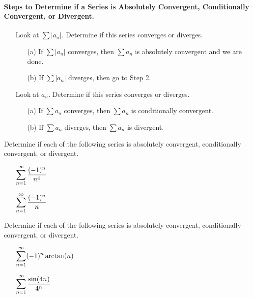 \documentclass[12pt]{article}
\begin{document}
\vspace{5mm}

\paragraph{Steps to Determine if a Series is Absolutely Convergent, Conditionally \\ Convergent, or Divergent.}
\begin{enumerate}
	\item[\tc{1}] Look at $\sum |a_n|$. Determine if this series converges or diverges.
	\begin{itemize}
		\item[(a)] If $\sum |a_n|$ converges, then $\sum a_n$ is absolutely convergent and we are done.
		\item[(b)] If $\sum|a_n|$ diverges, then go to Step 2.
	\end{itemize}
	\item[\tc{2}] Look at $a_n$. Determine if this series converges or diverges.
	\begin{itemize}
		\item[(a)] If $\sum a_n$ converges, then $\sum a_n$ is conditionally convergent.
		\item[(b)] If $\sum a_n$ diverges, then $\sum a_n$ is divergent.
	\end{itemize}
\end{enumerate}

\newpage

\Examples Determine if each of the following series is absolutely convergent, conditionally convergent, or divergent.

\begin{itemize}
\item[\tc{1}] $\displaystyle\sum_{n=1}^\infty \dfrac{(-1)^n}{n^4}$

\vfill

\item[\tc{2}] $\displaystyle\sum_{n=1}^\infty \dfrac{(-1)^n}{n}$

\vfill
\end{itemize}

\newpage

\ExamplesCont Determine if each of the following series is absolutely convergent, conditionally convergent, or divergent.

\begin{itemize}
\item[\tc{3}] $\displaystyle\sum_{n=1}^\infty(-1)^n\arctan(n)$

\vfill

\item[\tc{4}] $\displaystyle\sum_{n=1}^\infty \dfrac{\sin(4n)}{4^n}$

\vfill
\end{itemize}
\end{document}
